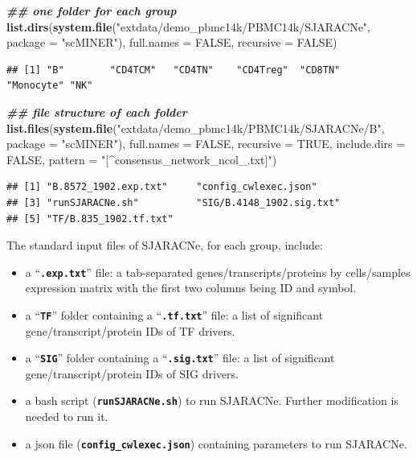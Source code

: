 \documentclass[
  12pt,
]{book}
\newenvironment{Shaded}{\begin{snugshade}}{\end{snugshade}}
\newcommand{\AttributeTok}[1]{\textcolor[rgb]{0.13,0.29,0.53}{#1}}
\newcommand{\ConstantTok}[1]{\textcolor[rgb]{0.56,0.35,0.01}{#1}}
\newcommand{\DocumentationTok}[1]{\textcolor[rgb]{0.56,0.35,0.01}{\textbf{\textit{#1}}}}
\newcommand{\FunctionTok}[1]{\textcolor[rgb]{0.13,0.29,0.53}{\textbf{#1}}}
\newcommand{\NormalTok}[1]{#1}
\newcommand{\StringTok}[1]{\textcolor[rgb]{0.31,0.60,0.02}{#1}}
\providecommand{\tightlist}{%
  \setlength{\itemsep}{0pt}\setlength{\parskip}{0pt}}
\begin{document}
\begin{Shaded}
\begin{Highlighting}[]
\DocumentationTok{\#\# one folder for each group}
\FunctionTok{list.dirs}\NormalTok{(}\FunctionTok{system.file}\NormalTok{(}\StringTok{"extdata/demo\_pbmc14k/PBMC14k/SJARACNe"}\NormalTok{, }\AttributeTok{package =} \StringTok{"scMINER"}\NormalTok{), }\AttributeTok{full.names =} \ConstantTok{FALSE}\NormalTok{, }\AttributeTok{recursive =} \ConstantTok{FALSE}\NormalTok{)}
\end{Highlighting}
\end{Shaded}

\begin{verbatim}
## [1] "B"        "CD4TCM"   "CD4TN"    "CD4Treg"  "CD8TN"    "Monocyte" "NK"
\end{verbatim}

\begin{Shaded}
\begin{Highlighting}[]
\DocumentationTok{\#\# file structure of each folder}
\FunctionTok{list.files}\NormalTok{(}\FunctionTok{system.file}\NormalTok{(}\StringTok{"extdata/demo\_pbmc14k/PBMC14k/SJARACNe/B"}\NormalTok{, }\AttributeTok{package =} \StringTok{"scMINER"}\NormalTok{), }\AttributeTok{full.names =} \ConstantTok{FALSE}\NormalTok{, }\AttributeTok{recursive =} \ConstantTok{TRUE}\NormalTok{, }\AttributeTok{include.dirs =} \ConstantTok{FALSE}\NormalTok{, }\AttributeTok{pattern =} \StringTok{"[\^{}consensus\_network\_ncol\_.txt]"}\NormalTok{)}
\end{Highlighting}
\end{Shaded}

\begin{verbatim}
## [1] "B.8572_1902.exp.txt"     "config_cwlexec.json"    
## [3] "runSJARACNe.sh"          "SIG/B.4148_1902.sig.txt"
## [5] "TF/B.835_1902.tf.txt"
\end{verbatim}

The standard input files of SJARACNe, for each group, include:

\begin{itemize}
\tightlist
\item
  a ``\textbf{\texttt{.exp.txt}}'' file: a tab-separated genes/transcripts/proteins by cells/samples expression matrix with the first two columns being ID and symbol.
\item
  a ``\textbf{\texttt{TF}}'' folder containing a ``\textbf{\texttt{.tf.txt}}'' file: a list of significant gene/transcript/protein IDs of TF drivers.
\item
  a ``\textbf{\texttt{SIG}}'' folder containing a ``\textbf{\texttt{.sig.txt}}'' file: a list of significant gene/transcript/protein IDs of SIG drivers.
\item
  a bash script (\textbf{\texttt{runSJARACNe.sh}}) to run SJARACNe. Further modification is needed to run it.
\item
  a json file (\textbf{\texttt{config\_cwlexec.json}}) containing parameters to run SJARACNe.
\end{itemize}
\end{document}
